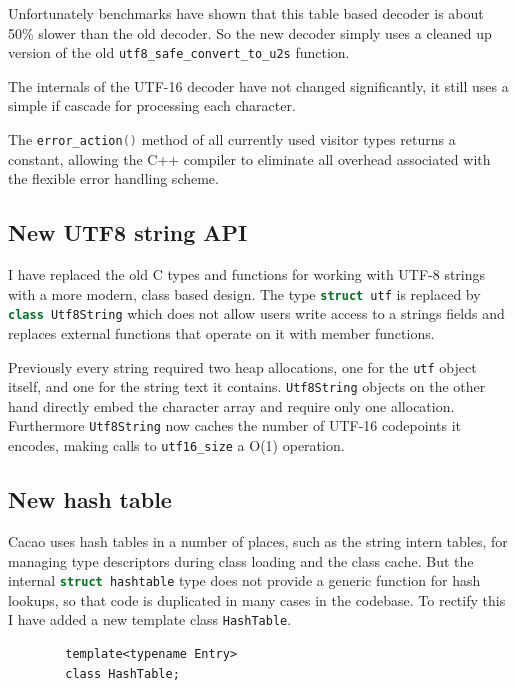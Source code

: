 \documentclass[12pt,a4paper,oneside]{article}
\newcommand{\cpp}[1]{\lstinline[language=C++]{#1}}
\begin{document}
	Unfortunately benchmarks have shown that this table based decoder is about 50\% slower than the old decoder.
	So the new decoder simply uses a cleaned up version of the old \cpp{utf8_safe_convert_to_u2s} function.

	The internals of the UTF-16 decoder have not changed significantly, it still uses a simple if cascade for processing
	each character.

	The \cpp{error_action()} method of all currently used visitor types returns a constant, allowing the C++ compiler 
	to eliminate all overhead associated with the flexible error handling scheme.

\subsection{New UTF8 string API}

	I have replaced the old C types and functions for working with UTF-8 strings with a more modern, class based design.
	The type \cpp{struct utf} is replaced by \cpp{class Utf8String} which does not allow users write access to a strings
	fields and replaces external functions that operate on it with member functions.

	Previously every string required two heap allocations, one for the \cpp{utf} object itself, and one for the string 
	text it contains. \cpp{Utf8String} objects on the other hand directly embed the character array and require only one 
	allocation.
	Furthermore \cpp{Utf8String} now caches the number of UTF-16 codepoints it encodes, making calls to \cpp{utf16_size} a 
	O(1) operation.

\subsection{New hash table}
	Cacao uses hash tables in a number of places, such as the string intern tables, for managing type descriptors during class loading and the class cache.
	But the internal \cpp{struct hashtable} type does not provide a generic function for hash lookups, so that code is duplicated in many
	cases in the codebase.
	To rectify this I have added a new template class \cpp{HashTable}.

	\begin{lstlisting}
		template<typename Entry>
		class HashTable;
	\end{lstlisting}
\end{document}
